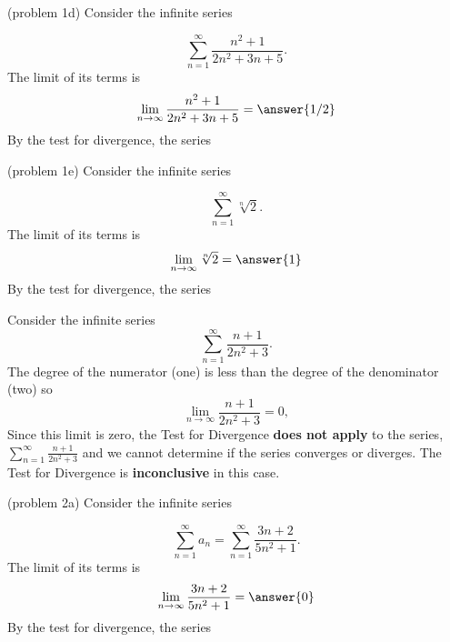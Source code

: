\documentclass{ximera}
\begin{document}
\begin{problem}(problem 1d)
Consider the infinite series

\[
\sum_{n=1}^\infty \frac{n^2 + 1}{2n^2 + 3n + 5}.
\]
The limit of its terms is
\[
\lim_{n\to \infty} \frac{n^2 + 1}{2n^2 + 3n + 5} = \answer{1/2}
\]
By the test for divergence, the series
\begin{multipleChoice}
\end{multipleChoice}

\end{problem}


\begin{problem}(problem 1e)
Consider the infinite series

\[
\sum_{n=1}^\infty \sqrt[n] 2.
\]
The limit of its terms is
\[
\lim_{n\to \infty} \sqrt[n] 2 = \answer{1}
\]
By the test for divergence, the series
\begin{multipleChoice}
\end{multipleChoice}

\end{problem}



\begin{example}
Consider the infinite series
\[
\sum_{n=1}^\infty \frac{n+1}{2n^2+3}.
\]
The degree of the numerator (one) is less than the degree of the denominator (two) so
\[
\lim_{n\to \infty} \frac{n+1}{2n^2+3} = 0,
\]
Since this limit is zero, the Test for Divergence \textbf{does not apply} to the series, $\displaystyle{\sum_{n=1}^\infty \frac{n+1}{2n^2+3}}$ and 
we cannot determine if the series converges or diverges. 
The Test for Divergence is \textbf{inconclusive} in this case.
 
\end{example}


\begin{problem}(problem 2a)
Consider the infinite series

\[
\sum_{n=1}^\infty a_n = \sum_{n=1}^\infty \frac{3n+2}{5n^2+1}.
\]
The limit of its terms is
\[
\lim_{n\to \infty} \frac{3n+2}{5n^2+1} = \answer{0}
\]
By the test for divergence, the series
\begin{multipleChoice}
\end{multipleChoice}

\end{problem}
\end{document}
